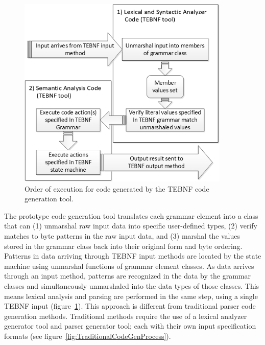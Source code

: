 \begin{figure}[htbp]
\centering
\includegraphics[width=0.9\textwidth]{figures/GeneratedCodeExecutionPath.png}
\caption{Order of execution for code generated by the TEBNF code generation tool.}
\label{fig:GeneratedCodeExecutionPath}
\end{figure}

\indent
The prototype code generation tool translates each grammar element into a class that can (1) unmarshal raw input data into specific user-defined types, (2) verify matches to byte patterns in the raw input data, and (3) marshal the values stored in the grammar class back into their original form and byte ordering.  Patterns in data arriving through TEBNF input methods are located by the state machine using unmarshal functions of grammar element classes.  As data arrives through an input method, patterns are recognized in the data by the grammar classes and simultaneously unmarshaled into the data types of those classes.  This means lexical analysis and parsing are performed in the same step, using a single TEBNF input (figure~\ref{fig:GeneratedCodeExecutionPath}).  This approach is different from traditional parser code generation methods.  Traditional methods require the use of a lexical analyzer generator tool and parser generator tool; each with their own input specification formats (see figure~\ref{fig:TraditionalCodeGenProcess}).

